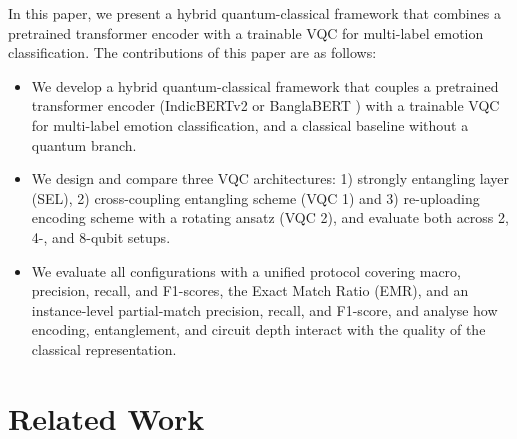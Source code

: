 \documentclass[runningheads]{llncs}
\begin{document}
In this paper, we present a hybrid quantum-classical framework that combines a pretrained transformer encoder with a trainable VQC for multi-label emotion classification. The contributions of this paper are as follows:
\begin{itemize}[leftmargin=*, nosep, noitemsep]
    \item We develop a hybrid quantum-classical framework that couples a pretrained transformer encoder (IndicBERTv2 \cite{doddapaneni2023towards} or BanglaBERT \cite{bhattacharjee2022banglabert}) with a trainable VQC for multi-label emotion classification, and a classical baseline without a quantum branch.
    \item We design and compare three VQC architectures: 1) strongly entangling layer (SEL), 2) cross-coupling entangling scheme (VQC 1) and 3) re-uploading encoding scheme with a rotating ansatz (VQC 2), and evaluate both across 2, 4-, and 8-qubit setups.
    \item We evaluate all configurations with a unified protocol covering macro, precision, recall, and F1-scores, the Exact Match Ratio (EMR), and an instance-level partial-match precision, recall, and F1-score, and analyse how encoding, entanglement, and circuit depth interact with the quality of the classical representation.
\end{itemize}


\section{Related Work}\label{sec:related}
\end{document}
